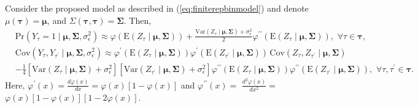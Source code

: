 \begin{proposition}
\label{prop:deltaapproxlogitnormal}
Consider the proposed model as described in (\ref{eq:finiterepbinmodel}) and 
denote $\mu(\boldsymbol{\tau})=\boldsymbol{\mu}$, 
and $\Sigma(\boldsymbol{\tau},\boldsymbol{\tau})=\boldsymbol{\Sigma}$. Then, 
\begin{align*}
&\text{Pr}(Y_{\tau}=1\mid \boldsymbol{\mu},\boldsymbol{\Sigma},\sigma_{\epsilon}^2)\approx \varphi(\text{E}(Z_{\tau}\mid \boldsymbol{\mu},\boldsymbol{\Sigma}))+\frac{\text{Var}(Z_{\tau}\mid \boldsymbol{\mu},\boldsymbol{\Sigma})+\sigma_{\epsilon}^2}{2}\varphi^{\prime\prime}(\text{E}(Z_{\tau}\mid \boldsymbol{\mu},\boldsymbol{\Sigma})),\,\, \forall \tau\in\boldsymbol{\tau}, \nonumber\\
&\text{Cov}(Y_{\tau},Y_{\tau^{\prime}}\mid\boldsymbol{\mu},\boldsymbol{\Sigma},\sigma_{\epsilon}^2)
\approx 
\varphi^{\prime}(\text{E}(Z_{\tau}\mid \boldsymbol{\mu},\boldsymbol{\Sigma}))\varphi^{\prime}(\text{E}(Z_{\tau^{\prime}}\mid \boldsymbol{\mu},\boldsymbol{\Sigma})) \, 
\text{Cov}(Z_{\tau},Z_{\tau^{\prime}}\mid\boldsymbol{\mu},\boldsymbol{\Sigma})\\
& -\frac{1}{4}[\text{Var}(Z_{\tau}\mid \boldsymbol{\mu},\boldsymbol{\Sigma})+\sigma_{\epsilon}^2][\text{Var}(Z_{\tau^{\prime}}\mid\boldsymbol{\mu},\boldsymbol{\Sigma})+\sigma_{\epsilon}^2]\varphi^{\prime\prime}(\text{E}(Z_{\tau}\mid \boldsymbol{\mu},\boldsymbol{\Sigma}))\varphi^{\prime\prime}(\text{E}(Z_{\tau^{\prime}}\mid \boldsymbol{\mu},\boldsymbol{\Sigma})),\,\, \forall \tau,\tau^{\prime}\in\boldsymbol{\tau}.
\end{align*}
Here, $\varphi^{\prime}(x)=\frac{d\varphi(x)}{dx}=\varphi(x)[1-\varphi(x)]$ 
and $\varphi^{\prime\prime}(x)=$ $\frac{d^2\varphi(x)}{dx^2}=$ 
$\varphi(x)[1-\varphi(x)][1-2\varphi(x)]$.
\end{proposition}

%
%


